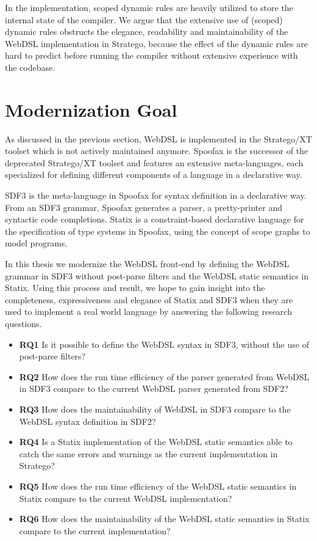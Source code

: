       In the implementation, scoped dynamic rules are heavily utilized to store the internal state of the compiler. We argue that the extensive use of (scoped) dynamic rules obstructs the elegance, readability and maintainability of the WebDSL implementation in Stratego, because the effect of the dynamic rules are hard to predict before running the compiler without extensive experience with the codebase.

  \section{\label{sec:modernization}Modernization Goal}

    As discussed in the previous section, WebDSL is implemented in the Stratego/XT toolset which is not actively maintained anymore. Spoofax is the successor of the deprecated Stratego/XT toolset and features an extensive meta-languages, each specialized for defining different components of a language in a declarative way.

    SDF3 \autocite{VollebregtKV12,AmorimV20} is the meta-language in Spoofax for syntax definition in a declarative way. From an SDF3 grammar, Spoofax generates a parser, a pretty-printer and syntactic code completions. Statix \autocite{VanAntwerpen2018} is a constraint-based declarative language for the specification of type systems in Spoofax, using the concept of scope graphs \autocite{Neron2015} to model programs.

    In this thesis we modernize the WebDSL front-end by defining the WebDSL grammar in SDF3 without post-parse filters and the WebDSL static semantics in Statix. Using this process and result, we hope to gain insight into the completeness, expressiveness and elegance of Statix and SDF3 when they are used to implement a real world language by answering the following research questions.

    \begin{itemize}
      \item \textbf{RQ1} Is it possible to define the WebDSL syntax in SDF3, without the use of post-parse filters?
      \item \textbf{RQ2} How does the run time efficiency of the parser generated from WebDSL in SDF3 compare to the current WebDSL parser generated from SDF2?
      \item \textbf{RQ3} How does the maintainability of WebDSL in SDF3 compare to the WebDSL syntax definition in SDF2?
      \item \textbf{RQ4} Is a Statix implementation of the WebDSL static semantics able to catch the same errors and warnings as the current implementation in Stratego?
      \item \textbf{RQ5} How does the run time efficiency of the WebDSL static semantics in Statix compare to the current WebDSL implementation?
      \item \textbf{RQ6} How does the maintainability of the WebDSL static semantics in Statix compare to the current implementation?
    \end{itemize}
